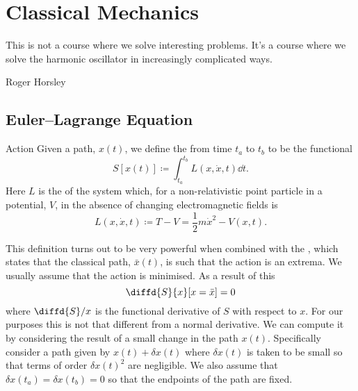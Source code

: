 \documentclass[fleqn]{NotesClass}
\newcommand*{\lagrangian}{L}
\begin{document}
    \chapter{Classical Mechanics}
    \epigraph{This is not a course where we solve interesting problems. It's a course where we solve the harmonic oscillator in increasingly complicated ways.}{Roger Horsley}
    \section{Euler--Lagrange Equation}
    \begin{dfn}{Action}{}
        Given a path, \(x(t)\), we define the  from time \(t_a\) to \(t_b\) to be the functional
        \begin{equation}
            S[x(t)] \coloneqq \int_{t_a}^{t_b} \lagrangian(x, \dot{x}, t) \dd{t}.
        \end{equation}
        Here \(\lagrangian\) is the  of the system which, for a non-relativistic point particle in a potential, \(V\), in the absence of changing electromagnetic fields is
        \begin{equation}
            \lagrangian(x, \dot{x}, t) \coloneqq T - V = \frac{1}{2}m\dot{x}^2 - V(x, t).
        \end{equation}
    \end{dfn}
    
    This definition turns out to be very powerful when combined with the , which states that the classical path, \(\bar{x}(t)\), is such that the action is an extrema.
    We usually assume that the action is minimised.
    As a result of this
    \begin{equation}
        \diffd{S}{x}[x=\bar{x}] = 0
    \end{equation}
    where \(\diffd{S}/{x}\) is the functional derivative of \(S\) with respect to \(x\).
    For our purposes this is not that different from a normal derivative.
    We can compute it by considering the result of a small change in the path \(x(t)\).
    Specifically consider a path given by \(x(t) + \delta x(t)\) where \(\delta x(t)\) is taken to be small so that terms of order \(\delta x(t)^2\) are negligible.
    We also assume that \(\delta x(t_a) = \delta x(t_b) = 0\) so that the endpoints of the path are fixed.
    
\end{document}
